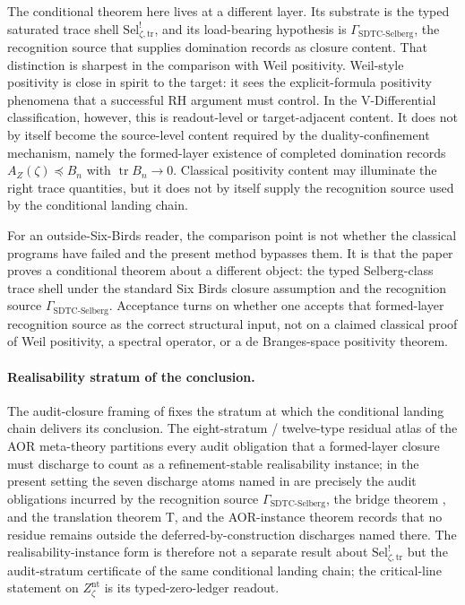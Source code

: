 \documentclass[11pt]{article}
\DeclareMathOperator{\trace}{tr}
\newcommand{\Znt}{Z_{\zeta}^{\mathrm{nt}}}
\newcommand{\AZ}{A_{Z}(\zeta)}
\newcommand{\Sel}{\mathrm{Sel}^{!}_{\zeta,\mathrm{tr}}}
\newcommand{\GamSDTCSelberg}{\Gamma_{\mathrm{SDTC\text{-}Selberg}}}
\theoremstyle{definition}
\begin{document}
The conditional theorem here lives at a different layer.  Its
substrate is the typed saturated trace shell \(\Sel\), and its
load-bearing hypothesis is \(\GamSDTCSelberg\), the recognition source
that supplies domination records as closure content.  That distinction
is sharpest in the comparison with Weil positivity.  Weil-style
positivity is close in spirit to the target: it sees the
explicit-formula positivity phenomena that a successful RH argument
must control.  In the V-Differential classification, however, this is
readout-level or target-adjacent content.  It does not by itself
become the source-level content required by the duality-confinement
mechanism, namely the formed-layer existence of completed domination
records \(\AZ\preceq B_n\) with \(\trace B_n\to0\).  Classical
positivity content may illuminate the right trace quantities, but it
does not by itself supply the recognition source used by the
conditional landing chain.

For an outside-Six-Birds reader, the comparison point is not
whether the classical programs have failed and the present method
bypasses them.  It is that the paper proves a conditional theorem
about a different object: the typed Selberg-class trace shell under
the standard Six Birds closure assumption and the recognition source
\(\GamSDTCSelberg\).  Acceptance turns on whether one accepts that
formed-layer recognition source as the correct structural input,
not on a claimed classical proof of Weil positivity, a spectral
operator, or a de Branges-space positivity theorem.

\paragraph{Realisability stratum of the conclusion.}
The audit-closure framing of \citet{TsiokosAOR2026} fixes the
stratum at which the conditional landing chain delivers its
conclusion.  The eight-stratum / twelve-type residual atlas of the
AOR meta-theory partitions every audit obligation that a formed-layer
closure must discharge to count as a refinement-stable realisability
instance; in the present setting the seven discharge atoms named in
 are precisely the audit obligations
incurred by the recognition source \(\GamSDTCSelberg\), the bridge
theorem , and the translation theorem
T, and the AOR-instance theorem records that no residue remains
outside the deferred-by-construction discharges named there.  The
realisability-instance form is therefore not a separate result
about \(\Sel\) but the audit-stratum certificate of the same
conditional landing chain; the critical-line statement on \(\Znt\)
is its typed-zero-ledger readout.
\end{document}
